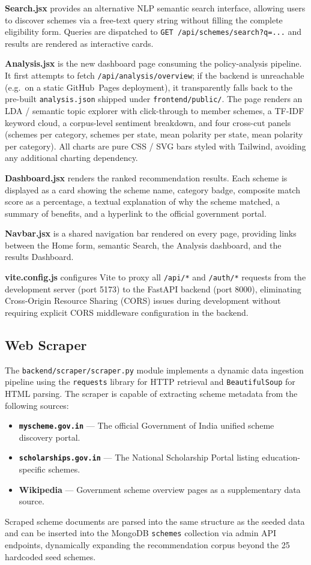 \documentclass[10pt, journal, twocolumn]{IEEEtran}
\begin{document}
\textbf{Search.jsx} provides an alternative NLP semantic search interface, allowing users to discover schemes via a free-text query string without filling the complete eligibility form. Queries are dispatched to \texttt{GET /api/schemes/search?q=...} and results are rendered as interactive cards.

\textbf{Analysis.jsx} is the new dashboard page consuming the policy-analysis pipeline. It first attempts to fetch \texttt{/api/analysis/overview}; if the backend is unreachable (e.g.\ on a static GitHub~Pages deployment), it transparently falls back to the pre-built \texttt{analysis.json} shipped under \texttt{frontend/public/}. The page renders an LDA / semantic topic explorer with click-through to member schemes, a TF-IDF keyword cloud, a corpus-level sentiment breakdown, and four cross-cut panels (schemes per category, schemes per state, mean polarity per state, mean polarity per category). All charts are pure CSS / SVG bars styled with Tailwind, avoiding any additional charting dependency.

\textbf{Dashboard.jsx} renders the ranked recommendation results. Each scheme is displayed as a card showing the scheme name, category badge, composite match score as a percentage, a textual explanation of why the scheme matched, a summary of benefits, and a hyperlink to the official government portal.

\textbf{Navbar.jsx} is a shared navigation bar rendered on every page, providing links between the Home form, semantic Search, the Analysis dashboard, and the results Dashboard.

\textbf{vite.config.js} configures Vite to proxy all \texttt{/api/*} and \texttt{/auth/*} requests from the development server (port 5173) to the FastAPI backend (port 8000), eliminating Cross-Origin Resource Sharing (CORS) issues during development without requiring explicit CORS middleware configuration in the backend.

\subsection{Web Scraper}
The \texttt{backend/scraper/scraper.py} module implements a dynamic data ingestion pipeline using the \texttt{requests} library for HTTP retrieval and \texttt{BeautifulSoup} \cite{beautifulsoup} for HTML parsing. The scraper is capable of extracting scheme metadata from the following sources:
\begin{itemize}
    \item \textbf{\texttt{myscheme.gov.in}} --- The official Government of India unified scheme discovery portal.
    \item \textbf{\texttt{scholarships.gov.in}} --- The National Scholarship Portal listing education-specific schemes.
    \item \textbf{Wikipedia} --- Government scheme overview pages as a supplementary data source.
\end{itemize}
Scraped scheme documents are parsed into the same structure as the seeded data and can be inserted into the MongoDB \texttt{schemes} collection via admin API endpoints, dynamically expanding the recommendation corpus beyond the 25 hardcoded seed schemes.
\end{document}
